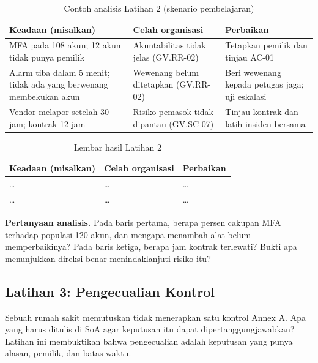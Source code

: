 \begin{table}[!htb]
  \centering\small
  \caption{Contoh analisis Latihan 2 (skenario pembelajaran)}\label{tab:ch06-lat2-contoh}
  \begin{tabularx}{\textwidth}{|>{\raggedright\arraybackslash}X|>{\raggedright\arraybackslash}X|>{\raggedright\arraybackslash}X|}
    \hline
    \textbf{Keadaan (misalkan)} & \textbf{Celah organisasi} & \textbf{Perbaikan} \\ \hline
    MFA pada 108 akun; 12 akun tidak punya pemilik & Akuntabilitas tidak jelas (GV.RR-02) & Tetapkan
    pemilik dan tinjau AC-01 \\ \hline
    Alarm tiba dalam 5 menit; tidak ada yang berwenang membekukan akun & Wewenang belum ditetapkan
    (GV.RR-02) & Beri wewenang kepada petugas jaga; uji eskalasi \\ \hline
    Vendor melapor setelah 30 jam; kontrak 12 jam & Risiko pemasok tidak dipantau (GV.SC-07) & Tinjau
    kontrak dan latih insiden bersama \\ \hline
  \end{tabularx}
\end{table}

\begin{table}[!htb]
  \centering\small
  \caption{Lembar hasil Latihan 2}\label{tab:ch06-lat2-hasil}
  \begin{tabularx}{\textwidth}{|>{\raggedright\arraybackslash}X|>{\raggedright\arraybackslash}X|>{\raggedright\arraybackslash}X|}
    \hline
    \textbf{Keadaan (misalkan)} & \textbf{Celah organisasi} & \textbf{Perbaikan} \\ \hline
    \dots & \dots & \dots \\ \hline
    \dots & \dots & \dots \\ \hline
  \end{tabularx}
\end{table}

\textbf{Pertanyaan analisis.} Pada baris pertama, berapa persen cakupan MFA terhadap populasi 120
akun, dan mengapa menambah alat belum memperbaikinya? Pada baris ketiga, berapa jam kontrak terlewati?
Bukti apa menunjukkan direksi benar menindaklanjuti risiko itu?

\subsection*{Latihan 3: Pengecualian Kontrol}

Sebuah rumah sakit memutuskan tidak menerapkan satu kontrol Annex A. Apa yang harus ditulis di SoA agar
keputusan itu dapat dipertanggungjawabkan? Latihan ini membuktikan bahwa pengecualian adalah keputusan
yang punya alasan, pemilik, dan batas waktu.

